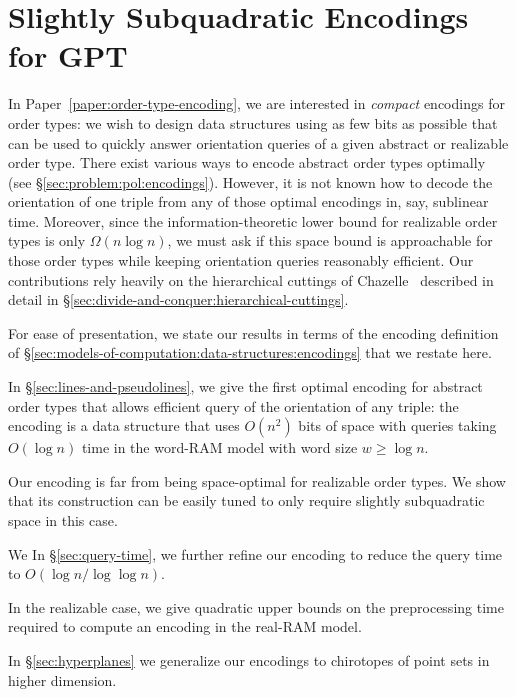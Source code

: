 \section{Slightly Subquadratic Encodings for GPT}


In Paper~\ref{paper:order-type-encoding},
we are interested in \emph{compact} encodings for
order types: we wish to design data structures using as few bits as possible
that can be used to quickly answer orientation queries of a given abstract or
realizable order type.
%
There exist various ways to encode abstract order types optimally (see
\S\ref{sec:problem:pol:encodings}).
%
However, it is not known how to decode the orientation of one triple from any
of those optimal encodings in, say, sublinear time.
%
Moreover, since the information-theoretic lower bound for realizable order
types is only \(\Omega(n \log n)\), we must ask if this space bound is
approachable for those order types while keeping orientation queries reasonably
efficient.
%
Our contributions rely heavily on the hierarchical cuttings of
Chazelle~\cite{C93} described in detail in
\S\ref{sec:divide-and-conquer:hierarchical-cuttings}.

For ease of presentation, we state our results in terms of the encoding
definition of \S\ref{sec:models-of-computation:data-structures:encodings} that
we restate here.
%
\DefinitionEncoding*

In \S\ref{sec:lines-and-pseudolines}, we
give the first optimal encoding for abstract
order types that allows efficient query of the orientation of any triple: the
encoding is a data structure that uses \( O(n^2) \) bits of space with queries
taking \(O(\log n)\) time in the word-RAM model with word size \(w \geq \log
n\).

%
Our encoding is far from being space-optimal for realizable order types.
We show that its construction can be easily tuned to only require
slightly subquadratic space in this case.

%
\ifeurocg%
We \else%
In \S\ref{sec:query-time}, we \fi%
further refine our encoding to
reduce the query time to \(O(\log{n}/\log{\log{n}})\).


%
In the realizable case, we give quadratic upper bounds on the
preprocessing time required to compute an encoding in the real-RAM model.

%
In \S\ref{sec:hyperplanes} we
generalize our encodings to chirotopes of
point sets in higher dimension.



